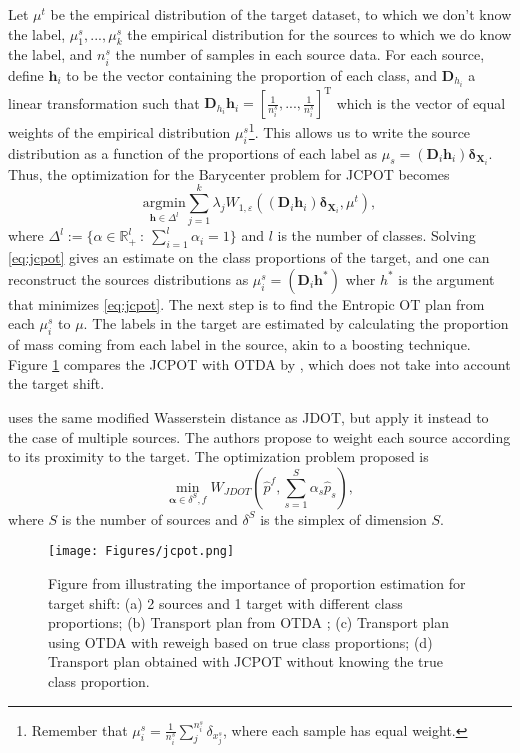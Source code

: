 Let $\mu^{t}$ be the empirical distribution
of the target dataset, to which we don't know the label, $\mu_1^{s},...,\mu_k^{s}$ the empirical
distribution for the sources to which we do know the label, and $n^s_{i}$
the number of samples in each source data. For each source, define $\mathbf h_i$ to
be the vector containing the proportion of each class, and $\mathbf D_{h_i}$ a linear transformation
such that $\mathbf D_{h_i} \mathbf h_i = [\frac{1}{n^s_i},...,\frac{1}{n^s_i}]^\mathrm T$ which is the vector
of equal weights of the empirical distribution $\mu^{s}_i$\footnote{Remember that
$\mu^{s}_i = \frac{1}{n^s_i}\sum^{n^s_i}_j \delta_{x_j^s}$, where each sample has equal weight.}.
This allows us to write the source distribution as a function of the proportions of each label as
$\mu_s = (\mathbf D_{i} \mathbf h_i) \bm \delta_{\mathbf X_i}$.
Thus, the optimization for the Barycenter problem for JCPOT becomes
\begin{equation}
  \underset{\mathbf h \in \Delta^l}{\mathrm{argmin}} \sum^k_{j=1}
  \lambda_j W_{1,\varepsilon} \left( 
  (\mathbf D_{i} \mathbf h_i) \bm \delta_{\mathbf X_i}, \mu^{t}
    \right),
    \label{eq:jcpot}
\end{equation}
where $\Delta^l := \{\alpha \in \mathbb R^l_+ \ : \ \sum^l_{i=1} \alpha_i = 1\}$ and $l$ is the number of classes.
Solving \eqref{eq:jcpot} gives an estimate on the class proportions of the target, and one can
reconstruct the sources distributions as $\mu^s_i = (\mathbf D_{i} \mathbf h^*)$ wher $h^*$
is the argument that minimizes \eqref{eq:jcpot}. The next step is to find the Entropic OT plan
from each $\mu^s_i$ to $\mu$.
The labels in the target are estimated by calculating the proportion of mass coming from each label
in the source, akin to a
boosting technique. Figure \ref{fig:jcpot} compares the JCPOT with OTDA by \citet{courty2014domain}, which
does not take into account the target shift.

\citet{turrisi2020multi} uses the same modified Wasserstein distance as JDOT, but apply it instead
to the case of multiple sources. The authors propose to weight each source according to its proximity
to the target. The optimization problem proposed is
\begin{equation}
  \min_{\mathbf \alpha \in \delta^S , f} W_{JDOT}\left(\hat{p}^f,
      \sum^S_{s=1} \alpha_s \hat{p}_s
  \right),
\end{equation}
where $S$ is the number of sources and $\delta^S$ is the simplex of dimension $S$.

\begin{figure}[H]
	\centering
	\texttt{[image: Figures/jcpot.png]}
	\caption{Figure from \citet{redko2019optimal} illustrating the importance of
  proportion estimation for target shift: (a) 2 sources and 1
target with different class proportions; (b) Transport plan from OTDA \citep{courty2014domain};
(c) Transport plan using OTDA with reweigh based on true class proportions;
(d) Transport plan obtained with JCPOT without knowing the true class proportion.}
	\label{fig:jcpot}
\end{figure}

